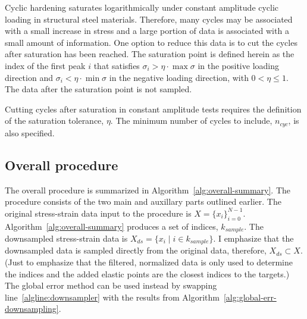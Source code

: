 \documentclass[a4paper,11pt]{article}
\begin{document}
Cyclic hardening saturates logarithmically under constant amplitude cyclic loading in structural steel materials.
Therefore, many cycles may be associated with a small increase in stress and a large portion of data is associated with a small amount of information.
One option to reduce this data is to cut the cycles after saturation has been reached.
The saturation point is defined herein as the index of the first peak $i$ that satisfies $\sigma_i > \eta \cdot \max \sigma$ in the positive loading direction and $\sigma_i < \eta \cdot \min \sigma$ in the negative loading direction, with $0 < \eta \leq 1$.
The data after the saturation point is not sampled.

Cutting cycles after saturation in constant amplitude tests requires the definition of the saturation tolerance, $\eta$.
The minimum number of cycles to include, $n_{cyc}$, is also specified.


\subsection{Overall procedure}

The overall procedure is summarized in Algorithm~\ref{alg:overall-summary}.
The procedure consists of the two main and auxillary parts outlined earlier.
The original stress-strain data input to the procedure is $X = \{x_i \}_{i=0}^{N-1}$.
Algorithm~\ref{alg:overall-summary} produces a set of indices, $k_{sample}$.
The downsampled stress-strain data is $X_{ds} = \{ x_i \mid i \in k_{sample} \}$.
I emphasize that the downsampled data is sampled directly from the original data, therefore, $X_{ds} \subset X$.
(Just to emphasize that the filtered, normalized data is only used to determine the indices and the added elastic points are the closest indices to the targets.)
The global error method can be used instead by swapping line~\ref{algline:downsampler} with the results from Algorithm~\ref{alg:global-err-downsampling}.
\end{document}
